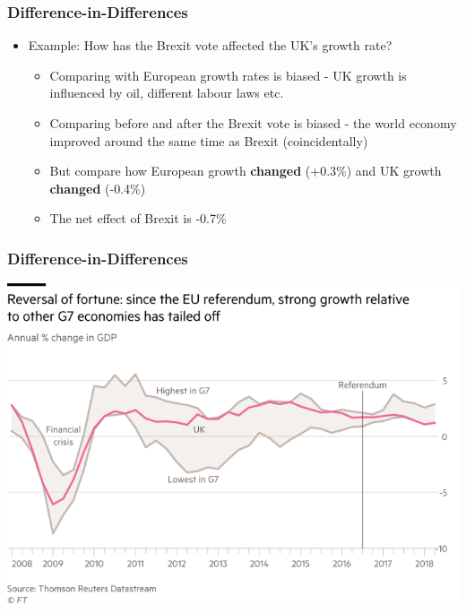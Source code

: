 \documentclass[xcolor=x11names,compress]{beamer}\usepackage[]{graphicx}\usepackage[]{color}
\renewcommand{\(}{\begin{columns}}
\renewcommand{\)}{\end{columns}}
\newcommand{\<}[1]{\begin{column}{#1}}
\renewcommand{\>}{\end{column}}
\begin{document}
\begin{frame}
\frametitle{Difference-in-Differences}
\begin{itemize}
\item Example: How has the Brexit vote affected the UK's growth rate?
\pause
\begin{itemize}
\item Comparing with European growth rates is biased - UK growth is influenced by oil, different labour laws etc.
\pause
\item Comparing before and after the Brexit vote is biased - the world economy improved around the same time as Brexit (coincidentally)
\pause
\item But compare how European growth \textbf{changed} (+0.3\%) and UK growth \textbf{changed} (-0.4\%)
\pause
\item The net effect of Brexit is -0.7\%
\end{itemize}
\end{itemize}
\end{frame}

\begin{frame}
\frametitle{Difference-in-Differences}
\begin{center}
\includegraphics[scale=0.7]{UK_EU_Growth.png}
\end{center}
\end{frame}
\end{document}
